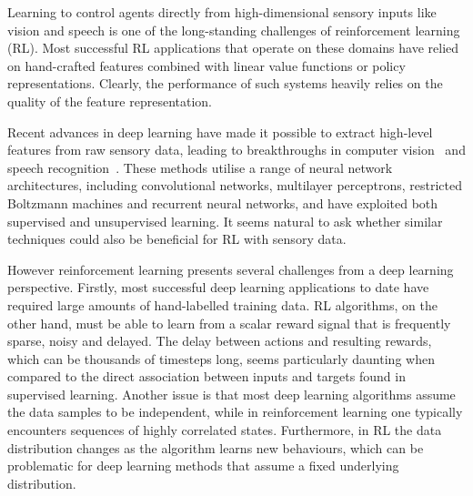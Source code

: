 \documentclass{article} %
\newcommand{\note}[1]{\textcolor{red}{\textbf{[Note: #1]}}}
\begin{document}

Learning to control agents directly from high-dimensional sensory inputs like vision and speech is one of the long-standing challenges of reinforcement learning (RL). 
Most successful RL applications that operate on these domains have relied on hand-crafted features combined with linear value functions or policy representations. 
Clearly, the performance of such systems heavily relies on the quality of the feature representation. %

Recent advances in deep learning have made it possible to extract high-level features from raw sensory data, leading to breakthroughs in computer vision~\cite{krizhevsky-imagenet, sermanet-cvpr-2013, mnih-thesis} and speech recognition~\cite{dahl-speech,graves-speech}.
These methods utilise a range of neural network architectures, including convolutional networks, multilayer perceptrons, restricted Boltzmann machines and recurrent neural networks, and have exploited both supervised and unsupervised learning. 
It seems natural to ask whether similar techniques could also be beneficial for RL with sensory data.

% 
% 
% 

However reinforcement learning presents several challenges from a deep learning perspective.
Firstly, most successful deep learning applications to date have required large amounts of hand-labelled training data.
RL algorithms, on the other hand, must be able to learn from a scalar reward signal that is frequently sparse, noisy and delayed.
The delay between actions and resulting rewards, which can be thousands of timesteps long, seems particularly daunting when compared to the direct association between inputs and targets found in supervised learning.
Another issue is that most deep learning algorithms assume the data samples to be independent, while in reinforcement learning one typically encounters sequences of highly correlated states.
Furthermore, in RL the data distribution changes as the algorithm learns new behaviours, which can be problematic for deep learning methods that assume a fixed underlying distribution.
\end{document}

